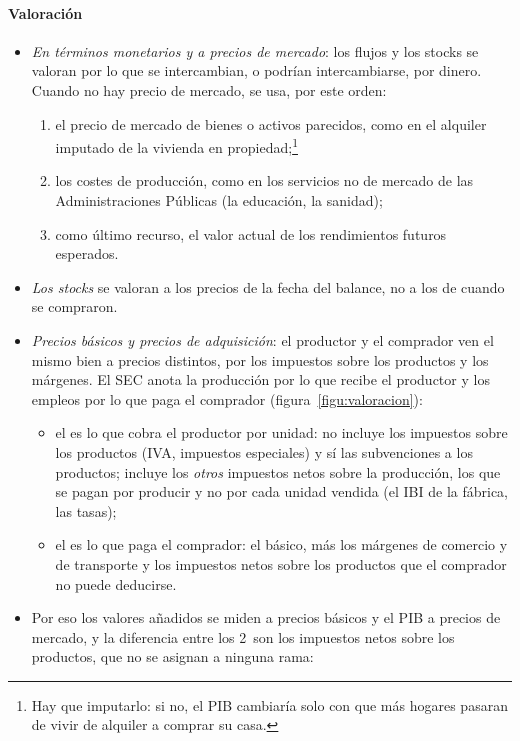 \documentclass[11pt]{article}
\begin{document}
\paragraph{Valoración}

\begin{itemize}
\item \emph{En términos monetarios y a precios de mercado}: los flujos y los stocks se valoran por lo que se intercambian, o podrían intercambiarse, por dinero. Cuando no hay precio de mercado, se usa, por este orden\nocite{SEC2010}:
  \begin{enumerate}
  \item el precio de mercado de bienes o activos parecidos, como en el alquiler imputado de la vivienda en propiedad;\footnote{Hay que imputarlo: si no, el PIB cambiaría solo con que más hogares pasaran de vivir de alquiler a comprar su casa.}
  \item los costes de producción, como en los servicios no de mercado de las Administraciones Públicas (la educación, la sanidad);
  \item como último recurso, el valor actual de los rendimientos futuros esperados.
  \end{enumerate}
\item \emph{Los stocks} se valoran a los precios de la fecha del balance, no a los de cuando se compraron.
\item \emph{Precios básicos y precios de adquisición}: el productor y el comprador ven el mismo bien a precios distintos, por los impuestos sobre los productos y los márgenes. El SEC anota la producción por lo que recibe el productor y los empleos por lo que paga el comprador (figura~\ref{figu:valoracion}):
  \begin{itemize}
  \item el  es lo que cobra el productor por unidad: no incluye los impuestos sobre los productos (IVA, impuestos especiales) y sí las subvenciones a los productos; incluye los \emph{otros} impuestos netos sobre la producción, los que se pagan por producir y no por cada unidad vendida (el IBI de la fábrica, las tasas)\nocite{Eurostat2013SEC2010};
  \item el  es lo que paga el comprador: el básico, más los márgenes de comercio y de transporte y los impuestos netos sobre los productos que el comprador no puede deducirse.
  \end{itemize}
\item Por eso los valores añadidos se miden a precios básicos y el PIB a precios de mercado, y la diferencia entre los 2~son los impuestos netos sobre los productos, que no se asignan a ninguna rama:

\end{itemize}
\end{document}
